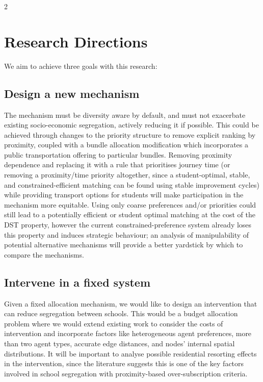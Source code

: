 \documentclass{article}
\begin{document}
\begin{multicols}{2}
\section{Research Directions}
We aim to achieve three goals with this research:

\subsection{Design a new mechanism}
The mechanism must be diversity aware by default, and must not exacerbate existing socio-economic segregation, actively reducing it if possible. This could be achieved through changes to the priority structure to remove explicit ranking by proximity, coupled with a bundle allocation modification which incorporates a public transportation offering to particular bundles. Removing proximity dependence and replacing it with a rule that prioritises journey time (or removing a proximity/time priority altogether, since a student-optimal, stable, and constrained-efficient matching can be found using stable improvement cycles) while providing transport options for students will make participation in the mechanism more equitable. Using only coarse preferences and/or priorities could still lead to a potentially efficient or student optimal matching at the cost of the DST property, however the current constrained-preference system already loses this property and induces strategic behaviour; an analysis of manipulability of potential alternative mechanisms will provide a better yardstick by which to compare the mechanisms.

\subsection{Intervene in a fixed system}
Given a fixed allocation mechanism, we would like to design an intervention that can reduce segregation between schools. This would be a budget allocation problem where we would extend existing work to consider the costs of intervention and incorporate factors like heterogeneous agent preferences, more than two agent types, accurate edge distances, and nodes' internal spatial distributions. It will be important to analyse possible residential resorting effects in the intervention, since the literature suggests this is one of the key factors involved in school segregation with proximity-based over-subscription criteria. 


\end{multicols}
\end{document}

